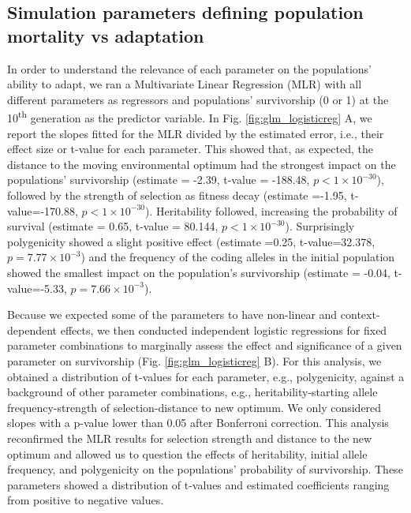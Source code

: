 \documentclass{article}
\begin{document}
\subsection{Simulation parameters defining population mortality vs adaptation}
In order to understand the relevance of each parameter on the populations' ability to adapt, we ran a Multivariate Linear Regression (MLR) with all different parameters as regressors and populations' survivorship (0 or 1) at the 10\textsuperscript{th} generation as the predictor variable. In Fig. \ref{fig:glm_logisticreg} A, we report the slopes fitted for the MLR divided by the estimated error, i.e., their effect size or t-value for each parameter. This showed that, as expected, the distance to the moving environmental optimum had the strongest impact on the populations' survivorship (estimate = -2.39, t-value = -188.48, $p<1 \times 10^{-30}$), followed by the strength of selection as fitness decay (estimate =-1.95, t-value=-170.88,  $p<1 \times 10^{-30}$). Heritability followed, increasing the probability of survival (estimate = 0.65, t-value = 80.144, $p<1 \times 10^{-30}$). Surprisingly polygenicity showed a slight positive effect  (estimate =0.25, t-value=32.378,  $p=7.77 \times 10^{-3}$) and the frequency of the coding alleles in the initial population showed the smallest impact on the population's survivorship (estimate = -0.04, t-value=-5.33,  $p=7.66 \times 10^{-3}$).

Because we expected some of the parameters to have non-linear and context-dependent effects, we then conducted independent logistic regressions for fixed parameter combinations to marginally assess the effect and significance of a given parameter on survivorship (Fig. \ref{fig:glm_logisticreg} B). For this analysis, we obtained a distribution of t-values for each parameter, e.g., polygenicity, against a background of other parameter combinations, e.g., heritability-starting allele frequency-strength of selection-distance to new optimum. We only considered slopes with a p-value lower than 0.05 after Bonferroni correction. This analysis reconfirmed the MLR results for selection strength and distance to the new optimum and allowed us to question the effects of heritability, initial allele frequency, and polygenicity on the populations' probability of survivorship. These parameters showed a distribution of t-values and estimated coefficients ranging from positive to negative values.
\end{document}
